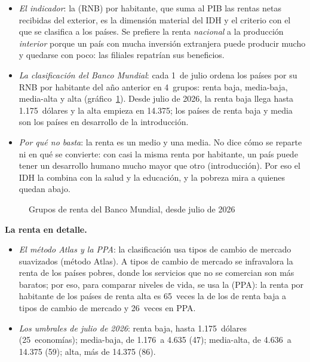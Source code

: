 \documentclass[11pt]{article}
\begin{document}
\begin{itemize}
\item \emph{El indicador}: la  (RNB) por habitante, que suma al PIB las rentas netas recibidas del exterior, es la dimensión material del IDH y el criterio con el que se clasifica a los países. Se prefiere la renta \emph{nacional} a la producción \emph{interior} porque un país con mucha inversión extranjera puede producir mucho y quedarse con poco: las filiales repatrían sus beneficios.
\item \emph{La clasificación del Banco Mundial}: cada 1~de julio ordena los países por su RNB por habitante del año anterior en 4~grupos: renta baja, media-baja, media-alta y alta (gráfico~\ref{fig:mapa-renta}). Desde julio de 2026, la renta baja llega hasta 1.175~dólares y la alta empieza en 14.375\nocite{BM2026ClasificacionRenta}; los países de renta baja y media son los países en desarrollo de la introducción.
\item \emph{Por qué no basta}: la renta es un medio y una media. No dice cómo se reparte ni en qué se convierte: con casi la misma renta por habitante, un país puede tener un desarrollo humano mucho mayor que otro (introducción). Por eso el IDH la combina con la salud y la educación, y la pobreza mira a quienes quedan abajo.
\end{itemize}

\begin{figure}[H]
\centering
\caption{Grupos de renta del Banco Mundial, desde julio de 2026}\label{fig:mapa-renta}
\end{figure}

\begin{anotaciones}
\textbf{La renta en detalle.}
\begin{itemize}
\item \emph{El método Atlas y la PPA}: la clasificación usa tipos de cambio de mercado suavizados (método Atlas). A tipos de cambio de mercado se infravalora la renta de los países pobres, donde los servicios que no se comercian son más baratos; por eso, para comparar niveles de vida, se usa la  (PPA): la renta por habitante de los países de renta alta es 65~veces la de los de renta baja a tipos de cambio de mercado y 26~veces en PPA\nocite{BM2026WDI}.
\item \emph{Los umbrales de julio de 2026}: renta baja, hasta 1.175~dólares (25~economías); media-baja, de 1.176~a 4.635 (47); media-alta, de 4.636~a 14.375 (59); alta, más de 14.375 (86)\nocite{BM2026ClasificacionRenta}.
\end{itemize}
\end{anotaciones}
\end{document}
